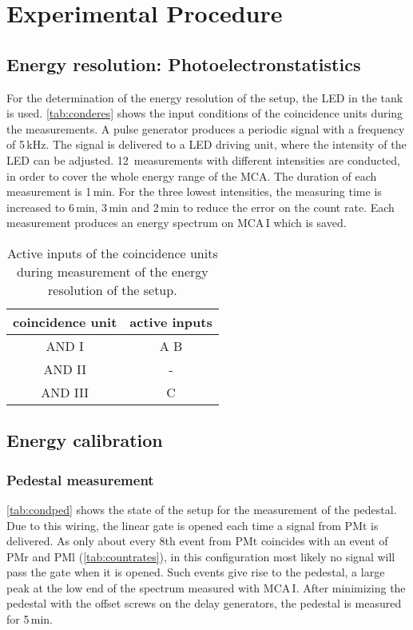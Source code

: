 \section{Experimental Procedure}


\subsection{Energy resolution: Photoelectronstatistics}
For the determination of the energy resolution of the setup, the LED in the tank is used.
\autoref{tab:conderes} shows the input conditions of the coincidence units during the measurements.
A pulse generator produces a periodic signal with a frequency of 5\,kHz.
The signal is delivered to a LED driving unit, where the intensity of the LED can be adjusted.
12~measurements with different intensities are conducted, in order to cover the whole energy range of the MCA.
The duration of each measurement is 1\,min.
For the three lowest intensities, the measuring time is increased to 6\,min, 3\,min and 2\,min to reduce the error
on the count rate.
Each measurement produces an energy spectrum on MCA\,I which is saved.

\begin{table}[H]
\caption{Active inputs of the coincidence units during measurement of the energy resolution of the setup.}
\begin{center}
\begin{tabular}{|c|c|}
  \hline
  coincidence unit	& active inputs	\\ \hline
  AND I				& A B			\\ \hline
  AND II			& -				\\ \hline
  AND III			& C				\\ \hline
 \end{tabular}
\end{center}
\label{tab:conderes}
\end{table}

\subsection{Energy calibration}

\subsubsection{Pedestal measurement}
\autoref{tab:condped} shows the state of the setup for the measurement of the pedestal.
Due to this wiring, the linear gate is opened each time a signal from PMt is delivered.
As only about every 8th event from PMt coincides with an event of PMr and PMl (\autoref{tab:countrates}),
in this configuration most likely no signal will pass the gate when it is opened.
Such events give rise to the pedestal, a large peak at the low end of the spectrum measured with MCA\,I.
After minimizing the pedestal with the offset screws on the delay generators, the pedestal is measured for
5\,min.

